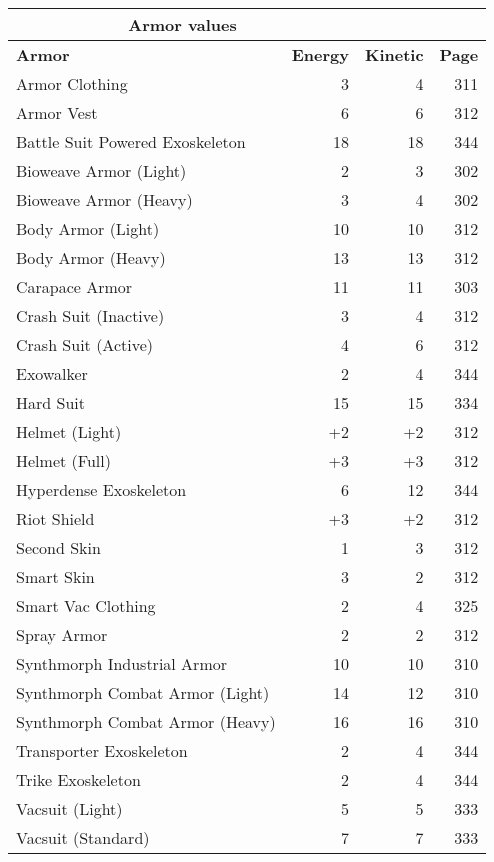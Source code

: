 \begin{table}
\begin{tabular}{|l|r|r|r|}
\hline
\multicolumn{2}{|c|}{\textbf{Armor values}}			\\
\hline
\textbf{Armor}					& \textbf{Energy} & \textbf{Kinetic}	& \textbf{Page} \\
\hline
Armor Clothing					& 3				& 4				& 311	\\
\hline
Armor Vest					& 6				& 6				& 312	\\
\hline
Battle Suit Powered Exoskeleton	& 18				& 18				& 344	\\
\hline
Bioweave Armor (Light)			& 2				& 3				& 302	\\
\hline
Bioweave Armor (Heavy)			& 3				& 4				& 302	\\
\hline
Body Armor (Light)				& 10				& 10				& 312	\\
\hline
Body Armor (Heavy)				& 13				& 13				& 312	\\
\hline
Carapace Armor					& 11				& 11				& 303	\\
\hline
Crash Suit (Inactive)			& 3				& 4				& 312	\\
\hline
Crash Suit (Active)				& 4				& 6				& 312	\\
\hline
Exowalker						& 2				& 4				& 344	\\
\hline
Hard Suit						& 15				& 15				& 334	\\
\hline
Helmet (Light)					& +2				& +2				& 312	\\
\hline
Helmet (Full)					& +3				& +3				& 312	\\
\hline
Hyperdense Exoskeleton			& 6				& 12				& 344	\\
\hline
Riot Shield					& +3				& +2				& 312	\\
\hline
Second Skin					& 1				& 3				& 312	\\
\hline
Smart Skin					& 3				& 2				& 312	\\
\hline
Smart Vac Clothing				& 2				& 4				& 325	\\
\hline
Spray Armor					& 2				& 2				& 312	\\
\hline
Synthmorph Industrial Armor		& 10				& 10				& 310	\\
\hline
Synthmorph Combat Armor (Light)	& 14				& 12				& 310	\\
\hline
Synthmorph Combat Armor (Heavy)	& 16				& 16				& 310	\\
\hline
Transporter Exoskeleton			& 2				& 4				& 344	\\
\hline
Trike Exoskeleton				& 2				& 4				& 344	\\
\hline
Vacsuit (Light)				& 5				& 5				& 333	\\
\hline
Vacsuit (Standard)				& 7				& 7				& 333	\\
\hline
\end{tabular}
\label{tab:armor-values}
\end{table}



